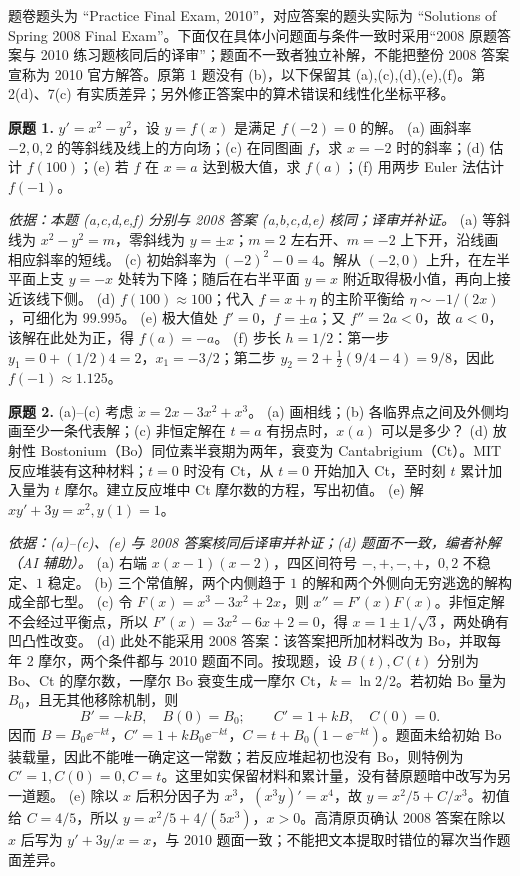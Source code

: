 题卷题头为 ``Practice Final Exam, 2010''，对应答案的题头实际为 ``Solutions of Spring 2008 Final Exam''。下面仅在具体小问题面与条件一致时采用“2008 原题答案与 2010 练习题核同后的译审”；题面不一致者独立补解，不能把整份 2008 答案宣称为 2010 官方解答。原第 1 题没有 (b)，以下保留其 (a),(c),(d),(e),(f)。第 2(d)、7(c) 有实质差异；另外修正答案中的算术错误和线性化坐标平移。
\begin{exercise}\label{cw:prfinal-1}\textbf{原题 1.} $y'=x^2-y^2$，设 $y=f(x)$ 是满足 $f(-2)=0$ 的解。
(a) 画斜率 $-2,0,2$ 的等斜线及线上的方向场；(c) 在同图画 $f$，求 $x=-2$ 时的斜率；(d) 估计 $f(100)$；(e) 若 $f$ 在 $x=a$ 达到极大值，求 $f(a)$；(f) 用两步 Euler 法估计 $f(-1)$。
\end{exercise}
\begin{solution}
\textit{依据：本题 (a,c,d,e,f) 分别与 2008 答案 (a,b,c,d,e) 核同；译审并补证。}
(a) 等斜线为 $x^2-y^2=m$，零斜线为 $y=\pm x$；$m=2$ 左右开、$m=-2$ 上下开，沿线画相应斜率的短线。
(c) 初始斜率为 $(-2)^2-0=4$。解从 $(-2,0)$ 上升，在左半平面上支 $y=-x$ 处转为下降；随后在右半平面 $y=x$ 附近取得极小值，再向上接近该线下侧。\ODEExamPracticeFinalField
(d) $f(100)\approx100$；代入 $f=x+\eta$ 的主阶平衡给 $\eta\sim-1/(2x)$，可细化为 $99.995$。
(e) 极大值处 $f'=0$，$f=\pm a$；又 $f''=2a<0$，故 $a<0$，该解在此处为正，得 $f(a)=-a$。
(f) 步长 $h=1/2$：第一步 $y_1=0+(1/2)4=2$，$x_1=-3/2$；第二步 $y_2=2+\tfrac12(9/4-4)=9/8$，因此 $f(-1)\approx1.125$。
\end{solution}
\begin{exercise}\label{cw:prfinal-2}\textbf{原题 2.}
(a)--(c) 考虑 $\dot x=2x-3x^2+x^3$。
(a) 画相线；(b) 各临界点之间及外侧均画至少一条代表解；(c) 非恒定解在 $t=a$ 有拐点时，$x(a)$ 可以是多少？
(d) 放射性 Bostonium（Bo）同位素半衰期为两年，衰变为 Cantabrigium（Ct）。MIT 反应堆装有这种材料；$t=0$ 时没有 Ct，从 $t=0$ 开始加入 Ct，至时刻 $t$ 累计加入量为 $t$ 摩尔。建立反应堆中 Ct 摩尔数的方程，写出初值。
(e) 解 $xy'+3y=x^2,y(1)=1$。
\end{exercise}
\begin{solution}
\textit{依据：(a)--(c)、(e) 与 2008 答案核同后译审并补证；(d) 题面不一致，编者补解（AI 辅助）。}
(a) 右端 $x(x-1)(x-2)$，四区间符号 $-,+,-,+$，$0,2$ 不稳定、$1$ 稳定。
(b) 三个常值解，两个内侧趋于 $1$ 的解和两个外侧向无穷逃逸的解构成全部七型。\ODEExamPracticeFinalPhase
(c) 令 $F(x)=x^3-3x^2+2x$，则 $x''=F'(x)F(x)$。非恒定解不会经过平衡点，所以 $F'(x)=3x^2-6x+2=0$，得 $x=1\pm1/\sqrt3$，两处确有凹凸性改变。
(d) 此处不能采用 2008 答案：该答案把所加材料改为 Bo，并取每年 $2$ 摩尔，两个条件都与 2010 题面不同。按现题，设 $B(t),C(t)$ 分别为 Bo、Ct 的摩尔数，一摩尔 Bo 衰变生成一摩尔 Ct，$k=\ln2/2$。若初始 Bo 量为 $B_0$，且无其他移除机制，则
\[B'=-kB,\quad B(0)=B_0;\qquad C'=1+kB,\quad C(0)=0.\]
因而 $B=B_0\ee^{-kt}$，$C'=1+kB_0\ee^{-kt}$，$C=t+B_0(1-\ee^{-kt})$。题面未给初始 Bo 装载量，因此不能唯一确定这一常数；若反应堆起初也没有 Bo，则特例为 $C'=1,C(0)=0,C=t$。这里如实保留材料和累计量，没有替原题暗中改写为另一道题。
(e) 除以 $x$ 后积分因子为 $x^3$，$(x^3y)'=x^4$，故 $y=x^2/5+C/x^3$。初值给 $C=4/5$，所以 $y=x^2/5+4/(5x^3)$，$x>0$。高清原页确认 2008 答案在除以 $x$ 后写为 $y'+3y/x=x$，与 2010 题面一致；不能把文本提取时错位的幂次当作题面差异。
\end{solution}
